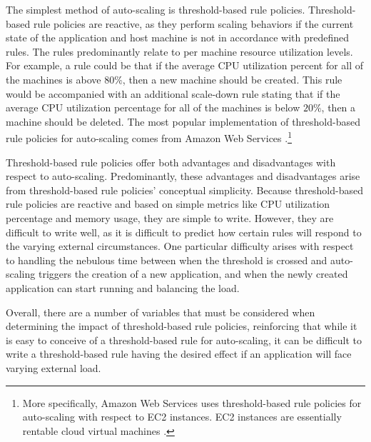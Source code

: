 The simplest method of auto-scaling is threshold-based rule policies.
Threshold-based rule policies are reactive, as they perform scaling behaviors if
the current state of the application and host machine
is not in accordance with predefined rules. The rules
predominantly relate to per machine resource utilization levels. For example, a
rule could be that if the average CPU utilization percent for all of the
machines is above $80\%$, then a new machine should be created. This rule would
be accompanied with an additional scale-down rule stating that if the average
CPU utilization percentage for all of the machines is below $20\%$, then a machine
should be deleted. The most popular implementation of threshold-based rule
policies for auto-scaling comes from Amazon Web Services
\cite{amazon-auto-scaling-developer-guide}.\footnote{More
specifically, Amazon Web Services uses threshold-based rule policies for
auto-scaling with respect to EC2 instances. EC2 instances are essentially
rentable cloud
virtual machines \cite{amazon-ec2}.}

Threshold-based rule policies offer both advantages and disadvantages with
respect to auto-scaling. Predominantly, these advantages and disadvantages arise
from threshold-based rule policies' conceptual simplicity.
Because threshold-based rule policies are reactive and based on simple metrics
like CPU utilization percentage and memory usage, they are simple to write.
However, they are difficult to write well, as it is difficult to predict how
certain rules will respond to the varying external circumstances. One particular
difficulty arises with respect to handling the nebulous time between when the
threshold is crossed and auto-scaling triggers the creation of a new
application, and when the newly created application can start running and
balancing the load.

Overall, there are a number of variables that must be considered when
determining the impact of threshold-based rule policies, reinforcing
that while it is easy to conceive of a threshold-based rule for auto-scaling,
it can be difficult to write a threshold-based rule having the desired effect if
an application will face varying external load.

